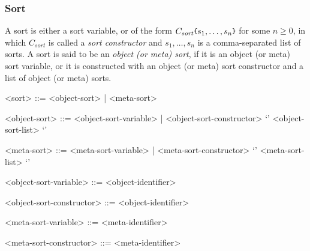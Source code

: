 \documentclass[UTF8,11pt]{article}
\theoremstyle{plain}
\theoremstyle{definition}
\theoremstyle{remark}
\newcommand{\parametric}[2]{{#1}\raisebox{.2ex}{\texttt{\footnotesize{\{}}}#2\raisebox{.2ex}{\texttt{\footnotesize{\}}}}}
\newcommand{\itsort}{\mathit{sort}}
\begin{document}
\subsubsection{Sort}
A sort is either a sort variable, or of the form 
$\parametric{C_\itsort}{s_1,\dots,s_n}$ for some $n \ge 0$, in which 
$C_\itsort$ is called a \emph{sort constructor} and $s_1,\dots,s_n$ is a 
comma-separated list of sorts.
A sort is said to be an \emph{object (or meta) sort}, if it is an object (or 
meta) sort variable, or it is constructed with an object (or meta) sort 
constructor and a list of object (or meta) sorts.
\begin{grammar}\small
	<sort> ::= <object-sort> | <meta-sort>
	
	<object-sort> ::= <object-sort-variable> | <object-sort-constructor> `{' 
	<object-sort-list> `}'
	
	<meta-sort> ::= <meta-sort-variable> | <meta-sort-constructor> `{' 
	<meta-sort-list> `}'

    <object-sort-variable> ::= <object-identifier>

    <object-sort-constructor> ::= <object-identifier>

    <meta-sort-variable> ::= <meta-identifier>

    <meta-sort-constructor> ::= <meta-identifier>
\end{grammar}
\end{document}

